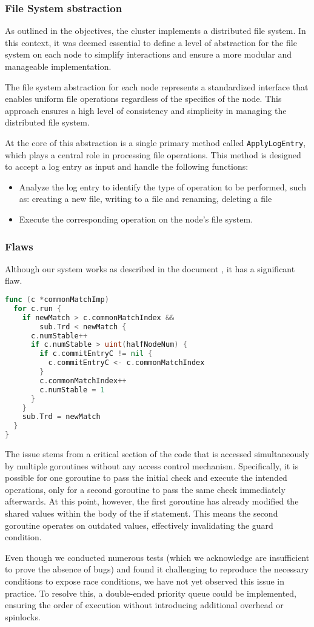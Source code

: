 \subsubsection{File System sbstraction}
As outlined in the objectives, the cluster implements a distributed file system.
In this context, it was deemed essential to define a level of abstraction for the 
file system on each node to simplify interactions and ensure a more modular and 
manageable implementation.

The file system abstraction for each node represents a standardized interface that 
enables uniform file operations regardless of the specifics of the node. This approach 
ensures a high level of consistency and simplicity in managing the distributed file system.

At the core of this abstraction is a single primary method called \texttt{ApplyLogEntry}, which 
plays a central role in processing file operations. This method is designed to accept 
a log entry as input and handle the following functions:
\begin{itemize}
  \item Analyze the log entry to identify the type of operation to be performed, such as: 
    creating a new file, writing to a file and renaming, deleting a file
  \item Execute the corresponding operation on the node's file system.
\end{itemize}


\subsubsection{Flaws}
Although our system works as described in the document \cite{1}, it has a significant flaw.
\begin{lstlisting}[language=Go]
func (c *commonMatchImp) 
  for c.run { 
    if newMatch > c.commonMatchIndex && 
        sub.Trd < newMatch { 
      c.numStable++ 
      if c.numStable > uint(halfNodeNum) {
        if c.commitEntryC != nil {
          c.commitEntryC <- c.commonMatchIndex
        } 
        c.commonMatchIndex++
        c.numStable = 1
      } 
    } 
    sub.Trd = newMatch
  } 
}
\end{lstlisting}
The issue stems from a critical section of the code that is accessed simultaneously
by multiple goroutines without any access control mechanism. Specifically, it is 
possible for one goroutine to pass the initial check and execute the intended operations, 
only for a second goroutine to pass the same check immediately afterwards. At this point, 
however, the first goroutine has already modified the shared values within the body 
of the if statement. This means the second goroutine operates on outdated values, 
effectively invalidating the guard condition.

Even though we conducted numerous tests (which we acknowledge are insufficient to 
prove the absence of bugs) and found it challenging to reproduce the necessary 
conditions to expose race conditions, we have not yet observed this issue in practice.
To resolve this, a double-ended priority queue could be implemented, ensuring 
the order of execution without introducing additional overhead or spinlocks.

